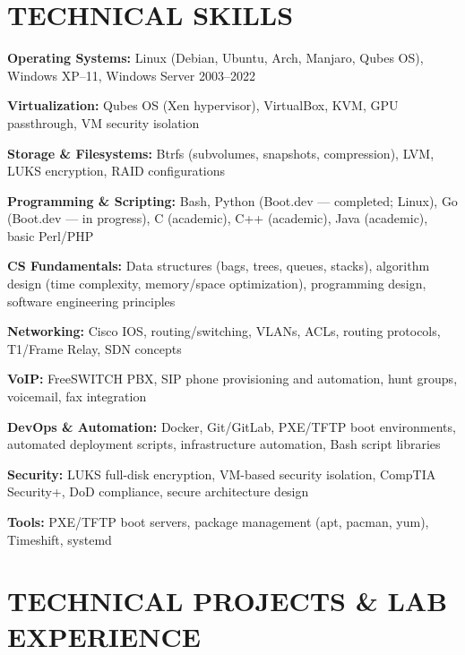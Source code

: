 \documentclass[9pt,letterpaper]{extarticle}
\begin{document}
\section*{TECHNICAL SKILLS}

\noindent\textbf{Operating Systems:} Linux (Debian, Ubuntu, Arch, Manjaro, Qubes OS), Windows XP--11, Windows Server 2003--2022

\noindent\textbf{Virtualization:} Qubes OS (Xen hypervisor), VirtualBox, KVM, GPU passthrough, VM security isolation

\noindent\textbf{Storage \& Filesystems:} Btrfs (subvolumes, snapshots, compression), LVM, LUKS encryption, RAID configurations

\noindent\textbf{Programming \& Scripting:} Bash, Python (Boot.dev --- completed; Linux), Go (Boot.dev --- in progress), C (academic), C++ (academic), Java (academic), basic Perl/PHP

\noindent\textbf{CS Fundamentals:} Data structures (bags, trees, queues, stacks), algorithm design (time complexity, memory/space optimization), programming design, software engineering principles

\noindent\textbf{Networking:} Cisco IOS, routing/switching, VLANs, ACLs, routing protocols, T1/Frame Relay, SDN concepts

\noindent\textbf{VoIP:} FreeSWITCH PBX, SIP phone provisioning and automation, hunt groups, voicemail, fax integration

\noindent\textbf{DevOps \& Automation:} Docker, Git/GitLab, PXE/TFTP boot environments, automated deployment scripts, infrastructure automation, Bash script libraries

\noindent\textbf{Security:} LUKS full-disk encryption, VM-based security isolation, CompTIA Security+, DoD compliance, secure architecture design

\noindent\textbf{Tools:} PXE/TFTP boot servers, package management (apt, pacman, yum), Timeshift, systemd

\section*{TECHNICAL PROJECTS \& LAB EXPERIENCE}
\end{document}
